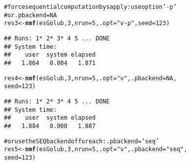 \documentclass[a4paper]{article}\usepackage{graphicx, color}
\makeatletter
\newcommand{\hlfunctioncall}[1]{\textcolor[rgb]{0.501960784313725,0,0.329411764705882}{\textbf{#1}}}%
\newcommand{\hlstring}[1]{\textcolor[rgb]{0.6,0.6,1}{#1}}%
\newcommand{\hlcomment}[1]{\textcolor[rgb]{0.180392156862745,0.6,0.341176470588235}{#1}}%
\newenvironment{kframe}{%
 \def\at@end@of@kframe{}%
 \ifinner\ifhmode%
  \def\at@end@of@kframe{\end{minipage}}%
  \begin{minipage}{\columnwidth}%
 \fi\fi%
 \def\FrameCommand##1{\hskip\@totalleftmargin \hskip-\fboxsep
 \colorbox{shadecolor}{##1}\hskip-\fboxsep
     \hskip-\linewidth \hskip-\@totalleftmargin \hskip\columnwidth}%
 \MakeFramed {\advance\hsize-\width
   \@totalleftmargin\z@ \linewidth\hsize
   \@setminipage}}%
 {\par\unskip\endMakeFramed%
 \at@end@of@kframe}
\newenvironment{knitrout}{}{} %
\makeatother
\begin{document}
\begin{knitrout}
\begin{kframe}
\begin{alltt}
\hlcomment{# force sequential computation by sapply: use option '-p'}
\hlcomment{# or .pbackend=NA}
res3 <- \hlfunctioncall{nmf}(esGolub, 3, nrun = 5, .opt = \hlstring{"v-p"}, seed = 123)
\end{alltt}


{\ttfamily\noindent\itshape\color{messagecolor}{\#\# NMF algorithm: 'brunet'}}

{\ttfamily\noindent\itshape\color{messagecolor}{\#\# Multiple runs: 5}}

{\ttfamily\noindent\itshape\color{messagecolor}{\#\# Mode: sequential [sapply]}}\begin{verbatim}
## Runs: 1* 2* 3* 4 5 ... DONE
## System time:
##    user  system elapsed 
##   1.864   0.004   1.871
\end{verbatim}
\begin{alltt}
res4 <- \hlfunctioncall{nmf}(esGolub, 3, nrun = 5, .opt = \hlstring{"v"}, .pbackend = NA, 
    seed = 123)
\end{alltt}


{\ttfamily\noindent\itshape\color{messagecolor}{\#\# NMF algorithm: 'brunet'}}

{\ttfamily\noindent\itshape\color{messagecolor}{\#\# Multiple runs: 5}}

{\ttfamily\noindent\itshape\color{messagecolor}{\#\# Mode: sequential [sapply]}}\begin{verbatim}
## Runs: 1* 2* 3* 4 5 ... DONE
## System time:
##    user  system elapsed 
##   1.884   0.000   1.887
\end{verbatim}
\begin{alltt}

\hlcomment{# or use the SEQ backend of foreach: .pbackend='seq'}
res5 <- \hlfunctioncall{nmf}(esGolub, 3, nrun = 5, .opt = \hlstring{"v"}, .pbackend = \hlstring{"seq"}, 
    seed = 123)
\end{alltt}


{\ttfamily\noindent\itshape\color{messagecolor}{\#\# NMF algorithm: 'brunet'}}

{\ttfamily\noindent\itshape\color{messagecolor}{\#\# Multiple runs: 5}}


\end{kframe}
\end{knitrout}
\end{document}
